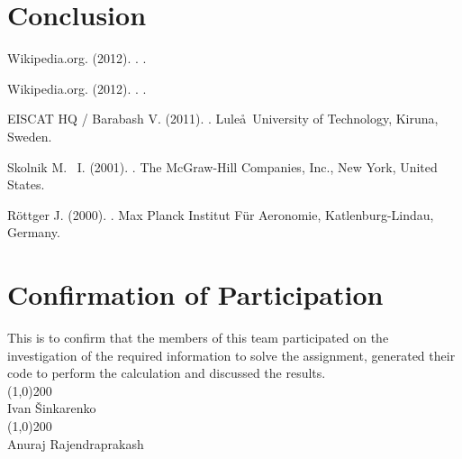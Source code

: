 \documentclass{article}
\def\authorivan{Ivan \v Sinkarenko}
\def\authoranu{Anuraj Rajendraprakash}
\begin{document}

\section{Conclusion}

\newpage
\begin{thebibliography}{9}

Wikipedia.org. (2012).
.
.

Wikipedia.org. (2012).
.
.

EISCAT HQ / Barabash V. (2011).
.
\newblock Lule\aa \ University of Technology, Kiruna, Sweden.

Skolnik M. ~I.  (2001).
.
\newblock The McGraw-Hill Companies, Inc., New York, United States.

R\"ottger J.  (2000).
.
\newblock Max Planck Institut F\"ur Aeronomie, Katlenburg-Lindau, Germany.


\end{thebibliography}

\newpage
\section{Confirmation of Participation}

This is to confirm that the members of this team participated on the investigation of the required information to solve the assignment, generated their code to perform the calculation and discussed the results.\\
\vspace{2cm}
\newline
\line(1,0){200}\\
\authorivan\\
\vspace{2cm}
\newline
\line(1,0){200}\\
\authoranu\\
\end{document}
